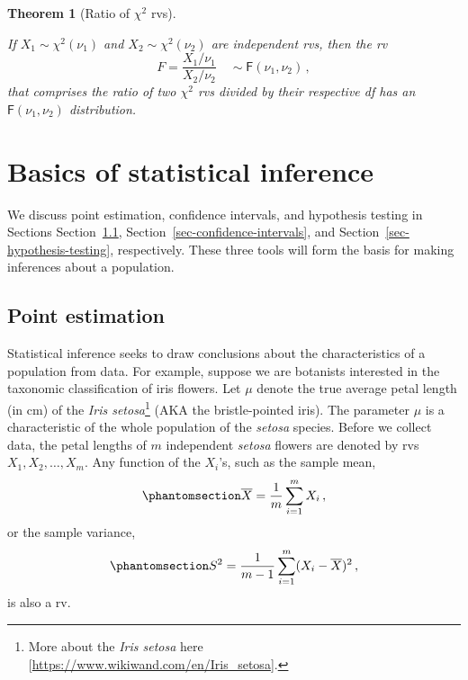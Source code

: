 \documentclass[
  a4paper,
  DIV=11,
  numbers=noendperiod,
  oneside]{scrreprt}
\theoremstyle{definition}
\theoremstyle{definition}
\theoremstyle{plain}
\theoremstyle{plain}
\newtheorem{theorem}{Theorem}[chapter]
\theoremstyle{definition}
\theoremstyle{remark}
\begin{document}
\begin{theorem}[Ratio of \(\chi^2\)
rvs]\protect\hypertarget{thm-F-dist-chisq}{}\label{thm-F-dist-chisq}

If \(X_1 \sim \chi^2(\nu_1)\) and \(X_2 \sim \chi^2(\nu_2)\) are
independent rvs, then the rv \[
 F = \frac{X_1 / \nu_1}{X_2 / \nu_2} \quad \sim \mathsf{F}(\nu_1,\nu_2)\,,
\] that comprises the ratio of two \(\chi^2\) rvs divided by their
respective df has an \(\mathsf{F}(\nu_1, \nu_2)\) distribution.

\end{theorem}

\chapter{Basics of statistical
inference}\label{sec-statistical-inference}

We discuss point estimation, confidence intervals, and hypothesis
testing in Sections Section~\ref{sec-point-estimation},
Section~\ref{sec-confidence-intervals}, and
Section~\ref{sec-hypothesis-testing}, respectively. These three tools
will form the basis for making inferences about a population.

\section{Point estimation}\label{sec-point-estimation}

Statistical inference seeks to draw conclusions about the
characteristics of a population from data. For example, suppose we are
botanists interested in the taxonomic classification of iris flowers.
Let \(\mu\) denote the true average petal length (in cm) of the
\emph{Iris setosa}\footnote{More about the \emph{Iris setosa} here
  {[}\url{https://www.wikiwand.com/en/Iris_setosa}{]}.} (AKA the
bristle-pointed iris). The parameter \(\mu\) is a characteristic of the
whole population of the \emph{setosa} species. Before we collect data,
the petal lengths of \(m\) independent \emph{setosa} flowers are denoted
by rvs \(X_1, X_2, \dots, X_m.\) Any function of the \(X_i\)'s, such as
the sample mean, \begin{equation}\phantomsection\label{eq-sample-mean}{
  \overline{X} = \frac{1}{m} \sum_{i=1}^m X_i\,, 
}\end{equation} or the sample variance,
\begin{equation}\phantomsection\label{eq-sample-var}{
  S^2 = \frac{1}{m-1} \sum_{i=1}^m (X_i - \overline{X})^2 \,, 
}\end{equation} is also a rv.
\end{document}
